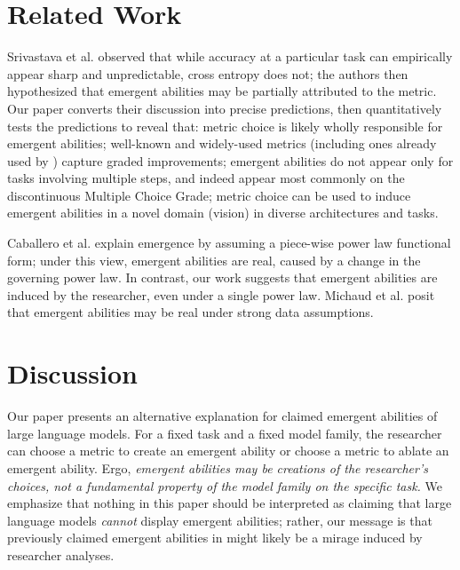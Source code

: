 \section{Related Work}

Srivastava et al. \cite{srivastava2022beyond} observed that while accuracy at a particular task can empirically appear sharp and unpredictable, cross entropy does not; the authors then hypothesized that emergent abilities may be partially attributed to the metric.
Our paper converts their discussion into precise predictions, then quantitatively tests the predictions to reveal that: metric choice is likely wholly responsible for emergent abilities; well-known and widely-used metrics (including ones already used by \cite{srivastava2022beyond}) capture graded improvements; emergent abilities do not appear only for tasks involving multiple steps, and indeed appear most commonly on the discontinuous Multiple Choice Grade; metric choice can be used to induce emergent abilities in a novel domain (vision) in diverse architectures and tasks.

Caballero et al. \cite{caballero2022broken} explain emergence by assuming a piece-wise power law functional form; under this view, emergent abilities are real, caused by a change in the governing power law. In contrast, our work suggests that emergent abilities are induced by the researcher, even under a single power law. Michaud et al. \cite{michaud2023quantization} posit that emergent abilities may be real under strong data assumptions.

\section{Discussion}

Our paper presents an alternative explanation for claimed emergent abilities of large language models. For a fixed task and a fixed model family, the researcher can choose a metric to create an emergent ability or choose a metric to ablate an emergent ability. Ergo, \textit{emergent abilities may be creations of the researcher's choices, not a fundamental property of the model family on the specific task.} We emphasize that nothing in this paper should be interpreted as claiming that large language models \textit{cannot} display emergent abilities; rather, our message is that previously claimed emergent abilities in \cite{brown2020language, ganguli2022predictability,srivastava2022beyond,wei2022emergent} might likely be a mirage induced by researcher analyses.

